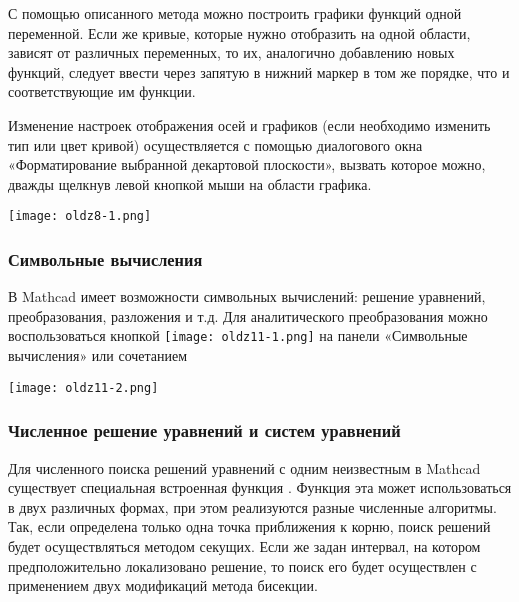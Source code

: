 С помощью описанного метода можно построить графики функций одной переменной. Если же кривые, которые нужно отобразить на одной области, зависят от различных переменных, то их, аналогично добавлению новых функций, следует ввести через запятую в нижний маркер в том же порядке, что и соответствующие им функции.

Изменение настроек отображения осей и графиков (если необходимо изменить тип или цвет кривой) осуществляется с помощью диалогового окна «Форматирование выбранной декартовой плоскости», вызвать которое можно, дважды щелкнув левой кнопкой мыши на области графика.


\begin{center}
	\texttt{[image: oldz8-1.png]}
\end{center}


\subsubsection*{Символьные вычисления}
В Mathcad имеет возможности символьных вычислений: решение уравнений, преобразования, разложения и т.д. Для аналитического преобразования можно воспользоваться кнопкой \texttt{[image: oldz11-1.png]} на панели «Символьные вычисления» или сочетанием 
	\begin{center}
		\texttt{[image: oldz11-2.png]}
	\end{center}

\subsubsection*{Численное решение уравнений и систем уравнений}
Для численного поиска решений уравнений с одним неизвестным в Mathcad существует специальная встроенная функция . Функция эта может использоваться в двух различных формах, при этом реализуются разные численные алгоритмы. Так, если определена только одна точка приближения к корню, поиск решений будет осуществляться методом секущих. Если же задан интервал, на котором предположительно локализовано решение, то поиск его будет осуществлен с применением двух модификаций метода бисекции.

